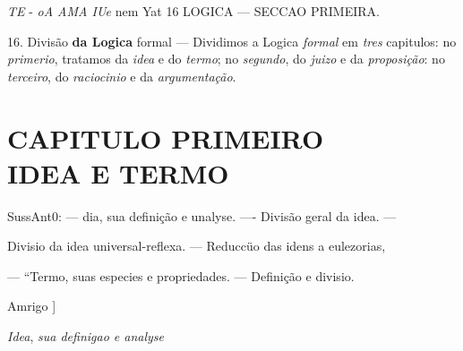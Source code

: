 \emph{TE} - \emph{oA AMA IUe} nem Yat 16 LOGICA --- SECCAO PRIMEIRA.

16. Divisão \textbf{da Logica} formal --- Dividimos a Logica \emph{formal} em \emph{tres} capitulos: no \emph{primerio}, tratamos da \emph{idea} e do \emph{termo}; no \emph{segundo}, do \emph{juizo} e da \emph{proposição}: no \emph{terceiro}, do \emph{raciocinio} e da \emph{argumentação}.


\chapter*{CAPITULO PRIMEIRO\\[0.3em]\large IDEA E TERMO}

  SussAnt0: --- dia, sua definição e unalyse. ---- Divisão geral da idea. ---

Divisio da idea universal-reflexa. --- Reduccüo das idens a eulezorias,

--- “Termo, suas especies e propriedades. --- Definição e divisio.

Amrigo ]

\emph{Idea}, \emph{sua definigao e analyse}

